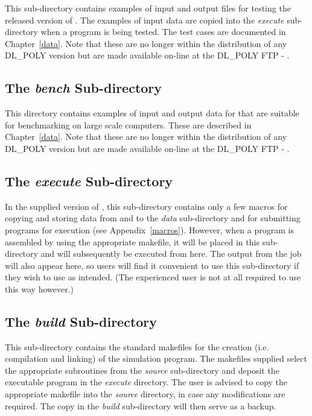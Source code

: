 This sub-directory contains examples of input and output files for
testing the released version of \D.  The examples of input data
are copied into the {\em execute} sub-directory when a program is
being tested.  The test cases are documented in Chapter~\ref{data}.
Note that these are no longer within the distribution of any
DL\_POLY version but are made available on-line at the DL\_POLY FTP
- \FTP{}.

\subsection{The {\em bench} Sub-directory}

This directory contains examples of input and output data for \D
that are suitable for benchmarking \D on large scale computers.
These are described in Chapter~\ref{data}. Note that these are no
longer within the distribution of any DL\_POLY version but
are made available on-line at the DL\_POLY FTP - \FTP{}.

\subsection{The {\em execute} Sub-directory}

In the supplied version of \D, this sub-directory contains only a
few macros for copying and storing data from and to the {\em data}
sub-directory and for submitting programs for execution (see
Appendix~\ref{macros}).  However, when a \D program is assembled
by using the appropriate makefile, it will be placed in this
sub-directory and will subsequently be executed from here.
The output from the job will also appear here, so users will
find it convenient to use this sub-directory if they wish to
use \D as intended.  (The experienced user is not at all
required to use \D this way however.)

\subsection{The {\em build} Sub-directory}

This sub-directory contains the standard makefiles for the
creation (i.e. compilation and linking) of the \D simulation
program.  The makefiles supplied select the appropriate
subroutines from the {\em source} sub-directory and deposit the
executable program in the {\em execute} directory.  The user is
advised to copy the appropriate makefile into the {\em source}
directory, in case any modifications are required.  The copy in
the {\em build} sub-directory will then serve as a backup.

